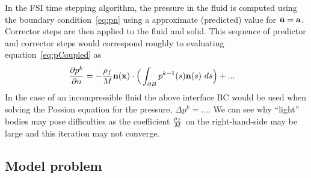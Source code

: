 In the FSI time stepping algorithm, the pressure in the fluid is computed using the boundary condition~\eqref{eq:pn}
using a approximate (predicted) value for $\dot{\mathbf{ u}}=\mathbf{ a}$. Corrector steps are then applied to the fluid and
solid. This sequence of predictor and corrector steps would correspond roughly to evaluating equation~\eqref{eq:pCoupled}
as 
\begin{align}
  {\partial p^{k}\over\partial n} &= - {\rho_f\over M} \mathbf{ n}(\mathbf{ x}) \cdot\Big( \int_{\partial B} p^{k-1}(s) \mathbf{ n}(s) ~ds \Big) + ...
\end{align}
In the case of an incompressible fluid the above interface BC would be used when solving 
the Possion equation for the pressure, $\Delta p^{k}=...$.  We can see why
``light'' bodies may pose difficulties as the coefficient ${\rho_f\over M}$ on
the right-hand-side may be large and this iteration may not converge.



\subsection{Model problem}

